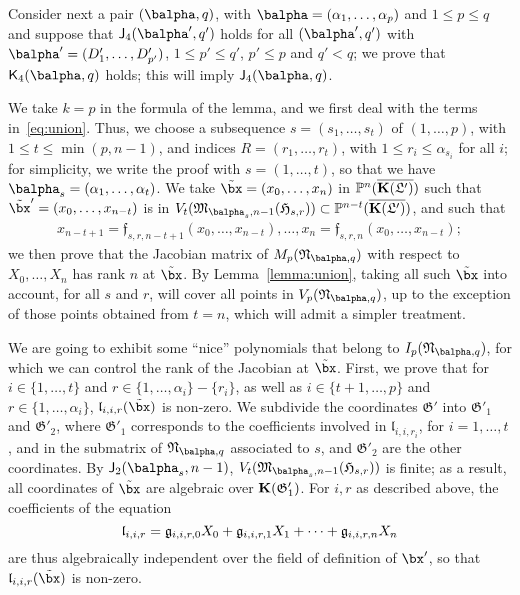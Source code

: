 \documentclass[12pt]{article}
\begin{document}
Consider next a pair $(\balpha,q)$, with $\balpha=(\alpha_1,\dots,\alpha_p)$ and $1 \le p
\le q$ and suppose that $\assI_4(\balpha',q')$ holds for all $(\balpha',q')$
with $\balpha'=(D'_1,\dots,D'_{p'})$, $1 \le p' \le q'$, $p' \le p$ and $q' <
q$; we prove that $\assJ_4(\balpha,q)$ holds; this will imply
 $\assI_4(\balpha,q)$. 

We take $k=p$ in the formula of the lemma, and we first deal with the
terms in~\eqref{eq:union}.  Thus, we choose a subsequence
$s=(s_1,\dots,s_t)$ of $(1,\dots,p)$, with $1 \le t\le \min(p,n-1)$,
and indices $R=(r_1,\dots,r_t)$, with $ 1\le r_i \le \alpha_{s_i}$ for all
$i$; for simplicity, we write the proof with $s=(1,\dots,t)$, so that
we have $\balpha_s=(\alpha_1,\dots,\alpha_t)$. We take $\tilde\bx=(x_0,\dots,x_n)$
in $\mathbb{P}^n(\overline{\mathbf{K}(\mathfrak{L}')})$ such that $\tilde \bx'=(x_0,\dots,x_{n-t})$
is in $V_t(\mathfrak{M}_{\balpha_s,n-1}(\mathfrak{H}_{s,r})) \subset
\P^{n-t}(\KKGpbar)$, and such that 
\begin{align}\label{eq:subsX}
  x_{n-t+1}=\mathfrak{f}_{s,r,n-t+1}(x_0,\dots,x_{n-t}),\dots,x_{n}=\mathfrak{f}_{s,r,n}(x_0,\dots,x_{n-t});
\end{align}
we then prove that the Jacobian matrix of $M_p(\mathfrak{N}_{\balpha,q})$
with respect to $X_0,\dots,X_n$ has rank $n$ at $\tilde\bx$.  By
Lemma~\ref{lemma:union}, taking all such $\tilde\bx$ into account, for
all $s$ and $r$, will cover all points in $V_p(\mathfrak{N}_{\balpha,q})$, up to the
exception of those points obtained from $t=n$, which will admit a
simpler treatment.

We are going to exhibit some ``nice'' polynomials that belong to
$I_p(\mathfrak{N}_{\balpha,q})$, for which we can control the rank of the
Jacobian at $\tilde\bx$. First, we prove that for $i\in\{1,\dots,t\}$
and $r \in \{1,\dots,\alpha_i\}-\{r_i\}$, as well as $i\in\{t+1,\dots,p\}$
and $r \in \{1,\dots,\alpha_i\}$, $\mathfrak{l}_{i,i,r}(\tilde\bx)$ is
non-zero.  We subdivide the coordinates $\mathfrak{G}'$ into
$\mathfrak{G}'_1$ and $\mathfrak{G}'_2$, where $\mathfrak{G}'_1$
corresponds to the coefficients involved in $\mathfrak{l}_{i,i,r_i}$,
for $i=1,\dots,t$, and in the submatrix of $\mathfrak{N}_{\balpha,q}$
associated to $s$, and $\mathfrak{G}'_2$ are the other coordinates.
By $\assI_2(\balpha_s,n-1)$,  $V_t(\mathfrak{M}_{\balpha_s,n-1}(\mathfrak{H}_{s,r}))$ 
is finite; as a result, all coordinates of $\tilde\bx$ are algebraic
over $\mathbf{K}(\mathfrak{G}'_1)$. For $i,r$ as described above, the coefficients of the equation
$$\mathfrak{l}_{i,i,r} = \frak{g}_{i,i,r,0} X_0+ \frak{g}_{i,i,r,1}
X_1 +\cdots + \frak{g}_{i,i,r,n} X_n$$ are thus algebraically independent
over the field of definition of $\bx'$, so that $\mathfrak{l}_{i,i,r}(\tilde\bx)$
is non-zero.
\end{document}
